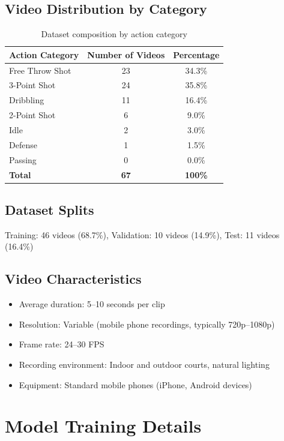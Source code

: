 \subsection{Video Distribution by Category}
\begin{table}[h]
\centering
\caption{Dataset composition by action category}
\begin{tabular}{lcc}
\toprule
Action Category & Number of Videos & Percentage \\
\midrule
Free Throw Shot & 23 & 34.3\% \\
3-Point Shot & 24 & 35.8\% \\
Dribbling & 11 & 16.4\% \\
2-Point Shot & 6 & 9.0\% \\
Idle & 2 & 3.0\% \\
Defense & 1 & 1.5\% \\
Passing & 0 & 0.0\% \\
\midrule
\textbf{Total} & \textbf{67} & \textbf{100\%} \\
\bottomrule
\end{tabular}
\label{tab:dataset}
\end{table}

\subsection{Dataset Splits}
Training: 46 videos (68.7\%), Validation: 10 videos (14.9\%), Test: 11 videos (16.4\%)

\subsection{Video Characteristics}
\begin{itemize}
    \item Average duration: 5--10 seconds per clip
    \item Resolution: Variable (mobile phone recordings, typically 720p--1080p)
    \item Frame rate: 24--30 FPS
    \item Recording environment: Indoor and outdoor courts, natural lighting
    \item Equipment: Standard mobile phones (iPhone, Android devices)
\end{itemize}

\section{Model Training Details}
\label{app:training}

